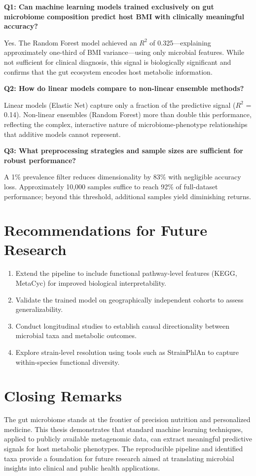 \textbf{Q1: Can machine learning models trained exclusively on gut microbiome composition predict host BMI with clinically meaningful accuracy?}

Yes. The Random Forest model achieved an $R^2$ of 0.325---explaining approximately one-third of BMI variance---using only microbial features. While not sufficient for clinical diagnosis, this signal is biologically significant and confirms that the gut ecosystem encodes host metabolic information.

\textbf{Q2: How do linear models compare to non-linear ensemble methods?}

Linear models (Elastic Net) capture only a fraction of the predictive signal ($R^2$ = 0.14). Non-linear ensembles (Random Forest) more than double this performance, reflecting the complex, interactive nature of microbiome-phenotype relationships that additive models cannot represent.

\textbf{Q3: What preprocessing strategies and sample sizes are sufficient for robust performance?}

A 1\% prevalence filter reduces dimensionality by 83\% with negligible accuracy loss. Approximately 10,000 samples suffice to reach 92\% of full-dataset performance; beyond this threshold, additional samples yield diminishing returns.

\section{Recommendations for Future Research}

\begin{enumerate}
    \item Extend the pipeline to include functional pathway-level features (KEGG, MetaCyc) for improved biological interpretability.
    \item Validate the trained model on geographically independent cohorts to assess generalizability.
    \item Conduct longitudinal studies to establish causal directionality between microbial taxa and metabolic outcomes.
    \item Explore strain-level resolution using tools such as StrainPhlAn to capture within-species functional diversity.
\end{enumerate}

\section{Closing Remarks}

The gut microbiome stands at the frontier of precision nutrition and personalized medicine. This thesis demonstrates that standard machine learning techniques, applied to publicly available metagenomic data, can extract meaningful predictive signals for host metabolic phenotypes. The reproducible pipeline and identified taxa provide a foundation for future research aimed at translating microbial insights into clinical and public health applications.
